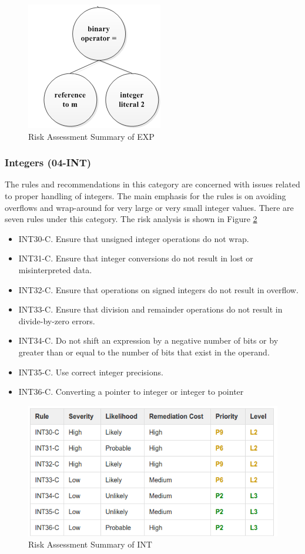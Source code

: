 \begin{figure}[H]
	
	
	\centering
	\includegraphics[width=.6\linewidth]{Figures/exp}
	\caption{Risk Assessment Summary of EXP}
	\label{fig:4}
	
\end{figure}
\subsubsection{Integers (04-INT)} The rules and recommendations in this category are concerned with issues related to proper handling of integers. The main emphasis for the rules is on avoiding overflows and wrap-around for very large or very small integer values. There are  seven  rules under this category. The risk analysis is shown in Figure \ref{fig:5}\cite{cert-c}
\begin{itemize}
	\item INT30-C. Ensure that unsigned integer operations do not wrap.
	\item INT31-C. Ensure that integer conversions do not result in lost or misinterpreted data.
	\item INT32-C. Ensure that operations on signed integers do not result in overflow.
	\item INT33-C. Ensure that division and remainder operations do not result in divide-by-zero errors.
	\item INT34-C. Do not shift an expression by a negative number of bits or by greater than or equal to the number of bits that exist in the operand.
	\item INT35-C. Use correct integer precisions.
	\item INT36-C. Converting a pointer to integer or integer to pointer
\end{itemize}
\begin{figure}[H]
	
	
	\centering
	\includegraphics[width=.6\linewidth]{Figures/int}
	\caption{Risk Assessment Summary of INT}
	\label{fig:5}
	
\end{figure}
